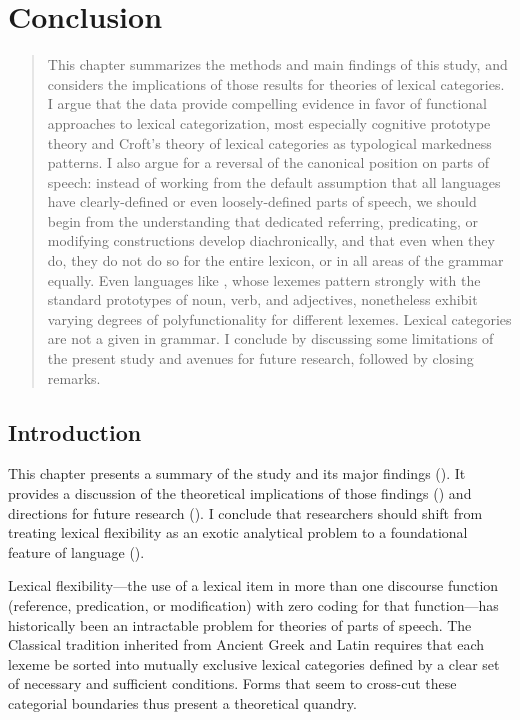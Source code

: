 \chapter{Conclusion}
\label{ch:conclusion}

\blockquote{This chapter summarizes the methods and main findings of this study, and considers the implications of those results for theories of lexical categories. I argue that the data provide compelling evidence in favor of functional approaches to lexical categorization, most especially cognitive prototype theory and Croft's theory of lexical categories as typological markedness patterns. I also argue for a reversal of the canonical position on parts of speech: instead of working from the default assumption that all languages have clearly-defined or even loosely-defined parts of speech, we should begin from the understanding that dedicated referring, predicating, or modifying constructions develop diachronically, and that even when they do, they do not do so for the entire lexicon, or in all areas of the grammar equally. Even languages like , whose lexemes pattern strongly with the standard prototypes of noun, verb, and adjectives, nonetheless exhibit varying degrees of polyfunctionality for different lexemes. Lexical categories are not a given in grammar. I conclude by discussing some limitations of the present study and avenues for future research, followed by closing remarks.}

\section{Introduction}
\label{sec:5.1}

This chapter presents a summary of the study and its major findings (). It provides a discussion of the theoretical implications of those findings () and directions for future research (). I conclude that researchers should shift from treating lexical flexibility as an exotic analytical problem to a foundational feature of language ().

Lexical flexibility—the use of a lexical item in more than one discourse function (reference, predication, or modification) with zero coding for that function—has historically been an intractable problem for theories of parts of speech. The Classical tradition inherited from Ancient Greek and Latin requires that each lexeme be sorted into mutually exclusive lexical categories defined by a clear set of necessary and sufficient conditions. Forms that seem to cross-cut these categorial boundaries thus present a theoretical quandry.

